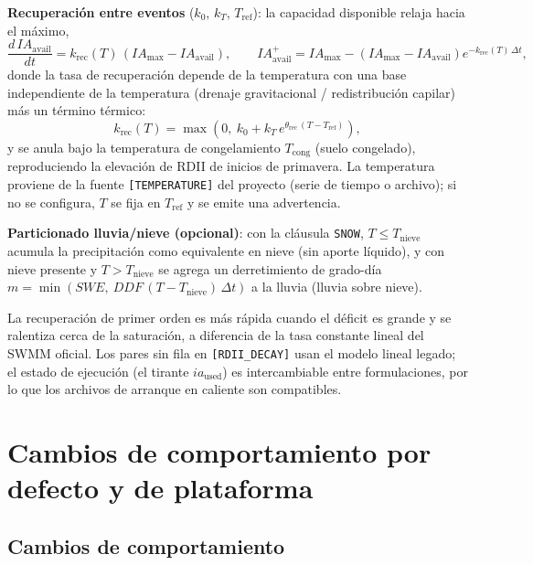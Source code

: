 \documentclass[11pt,a4paper]{article}
\begin{document}
\textbf{Recuperación entre eventos} ($k_0$, $k_T$, $T_{\mathrm{ref}}$): la
capacidad disponible relaja hacia el máximo,
\begin{equation}
  \frac{d\,IA_{\mathrm{avail}}}{dt} = k_{\mathrm{rec}}(T)\,
    \left(IA_{\max} - IA_{\mathrm{avail}}\right),
  \qquad
  IA_{\mathrm{avail}}^{+} = IA_{\max} - \left(IA_{\max} - IA_{\mathrm{avail}}\right)
    e^{-k_{\mathrm{rec}}(T)\,\Delta t},
\end{equation}
donde la tasa de recuperación depende de la temperatura con una base
independiente de la temperatura (drenaje gravitacional / redistribución
capilar) más un término térmico:
\begin{equation}
  k_{\mathrm{rec}}(T) = \max\!\left(0,\ k_0 + k_T\,
    e^{\theta_{\mathrm{rec}}\,(T - T_{\mathrm{ref}})}\right),
\end{equation}
y se anula bajo la temperatura de congelamiento $T_{\mathrm{cong}}$ (suelo
congelado), reproduciendo la elevación de RDII de inicios de primavera. La
temperatura proviene de la fuente \texttt{[TEMPERATURE]} del proyecto (serie de
tiempo o archivo); si no se configura, $T$ se fija en $T_{\mathrm{ref}}$ y se
emite una advertencia.

\textbf{Particionado lluvia/nieve (opcional)}: con la cláusula \texttt{SNOW},
$T \le T_{\mathrm{nieve}}$ acumula la precipitación como equivalente en nieve
(sin aporte líquido), y con nieve presente y $T > T_{\mathrm{nieve}}$ se agrega
un derretimiento de grado-día $m = \min(SWE,\ DDF\,(T - T_{\mathrm{nieve}})\,
\Delta t)$ a la lluvia (lluvia sobre nieve).

La recuperación de primer orden es más rápida cuando el déficit es grande y se
ralentiza cerca de la saturación, a diferencia de la tasa constante lineal del
SWMM oficial. Los pares sin fila en \texttt{[RDII\_DECAY]} usan el modelo
lineal legado; el estado de ejecución (el tirante $ia_{\mathrm{used}}$) es
intercambiable entre formulaciones, por lo que los archivos de arranque en
caliente son compatibles.

\section{Cambios de comportamiento por defecto y de plataforma}

\subsection{Cambios de comportamiento}
\end{document}
